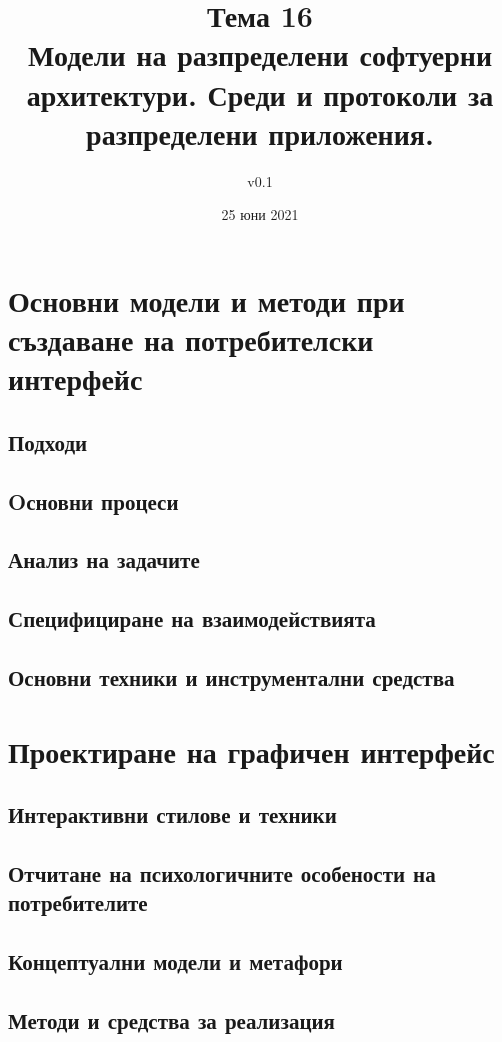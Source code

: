 \documentclass[fleqn,12pt]{article}
\title{Тема 16\\ Модели на разпределени софтуерни архитектури. Среди и протоколи за разпределени приложения.}
\author{v0.1}
\date{25 юни 2021}
\begin{document}
\maketitle
\tableofcontents
\pagebreak

\section{Основни  модели  и  методи  при  създаване  на  потребителски  интерфейс}

\subsection{Подходи}
\subsection{Oсновни процеси}
\subsection{Анализ на задачите}
\subsection{Специфициране на взаимодействията}
\subsection{Основни техники и инструментални средства}

\section{Проектиране на графичен интерфейс}

\subsection{Интерактивни стилове и техники}
\subsection{Отчитане на психологичните особености на потребителите}
\subsection{Концептуални модели и метафори}
\subsection{Методи и средства за реализация}
\end{document}
